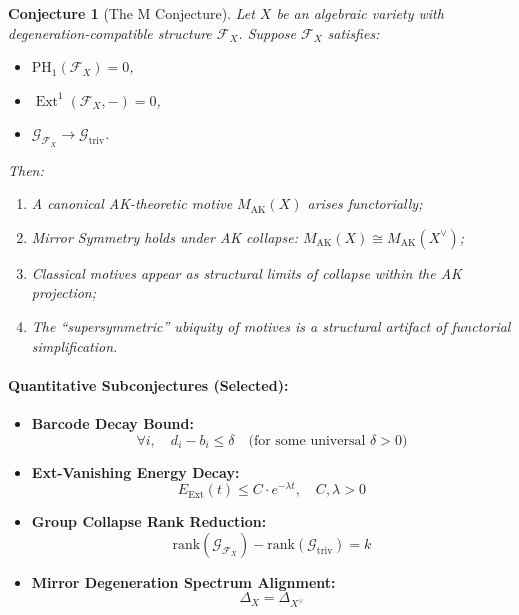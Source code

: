 \documentclass[11pt]{article}
\newtheorem{conjecture}{Conjecture}[section]
\DeclareMathOperator{\Ext}{Ext}
\begin{document}
\begin{conjecture}[The M Conjecture]
Let $X$ be an algebraic variety with degeneration-compatible structure $\mathcal{F}_X$. Suppose $\mathcal{F}_X$ satisfies:

\begin{itemize}
    \item $\mathrm{PH}_1(\mathcal{F}_X) = 0$,
    \item $\Ext^1(\mathcal{F}_X, -) = 0$,
    \item $\mathcal{G}_{\mathcal{F}_X} \longrightarrow \mathcal{G}_{\mathrm{triv}}$.
\end{itemize}

Then:

\begin{enumerate}
    \item A canonical AK-theoretic motive $M_{\mathrm{AK}}(X)$ arises functorially;
    \item Mirror Symmetry holds under AK collapse: $M_{\mathrm{AK}}(X) \cong M_{\mathrm{AK}}(X^{\vee})$;
    \item Classical motives appear as structural limits of collapse within the AK projection;
    \item The “supersymmetric” ubiquity of motives is a structural artifact of functorial simplification.
\end{enumerate}
\end{conjecture}

\paragraph{Quantitative Subconjectures (Selected):}

\begin{itemize}
    \item \textbf{Barcode Decay Bound:}
    \[
    \forall i, \quad d_i - b_i \leq \delta \quad \text{(for some universal } \delta > 0)
    \]
    \item \textbf{Ext-Vanishing Energy Decay:}
    \[
    E_{\mathrm{Ext}}(t) \leq C \cdot e^{-\lambda t}, \quad C, \lambda > 0
    \]
    \item \textbf{Group Collapse Rank Reduction:}
    \[
    \mathrm{rank}(\mathcal{G}_{\mathcal{F}_X}) - \mathrm{rank}(\mathcal{G}_{\mathrm{triv}}) = k
    \]
    \item \textbf{Mirror Degeneration Spectrum Alignment:}
    \[
    \Delta_X = \Delta_{X^{\vee}}
    \]
\end{itemize}
\end{document}
